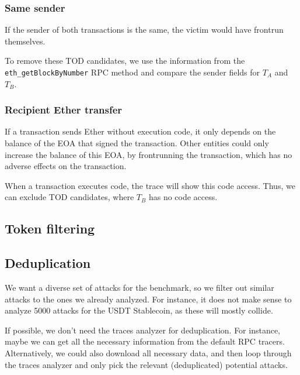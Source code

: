 \documentclass[draft,final]{vutinfth} %
\begin{document}
\subsubsection{Same sender}

If the sender of both transactions is the same, the victim would have frontrun themselves.

To remove these TOD candidates, we use the information from the \verb|eth_getBlockByNumber| RPC method and compare the sender fields for $T_A$ and $T_B$.

\subsubsection{Recipient Ether transfer}

If a transaction sends Ether without execution code, it only depends on the balance of the EOA that signed the transaction. Other entities could only increase the balance of this EOA, by frontrunning the transaction, which has no adverse effects on the transaction.

When a transaction executes code, the trace will show this code access. Thus, we can exclude TOD candidates, where $T_B$ has no code access.

\subsection{Token filtering}


\subsection{Deduplication}


\iffalse
    We want a diverse set of attacks for the benchmark, so we filter out similar attacks to the ones we already analyzed. For instance, it does not make sense to analyze 5000 attacks for the USDT Stablecoin, as these will mostly collide.

    If possible, we don't need the traces analyzer for deduplication. For instance, maybe we can get all the necessary information from the default RPC tracers.
    Alternatively, we could also download all necessary data, and then loop through the traces analyzer and only pick the relevant (deduplicated) potential attacks.
\end{document}
